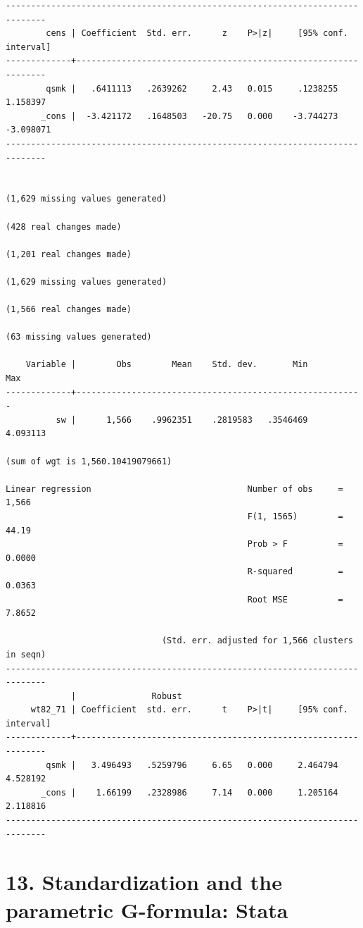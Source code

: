 \documentclass[
  10pt,
]{book}
\begin{document}
\begin{verbatim}
------------------------------------------------------------------------------
        cens | Coefficient  Std. err.      z    P>|z|     [95% conf. interval]
-------------+----------------------------------------------------------------
        qsmk |   .6411113   .2639262     2.43   0.015     .1238255    1.158397
       _cons |  -3.421172   .1648503   -20.75   0.000    -3.744273   -3.098071
------------------------------------------------------------------------------


(1,629 missing values generated)

(428 real changes made)

(1,201 real changes made)

(1,629 missing values generated)

(1,566 real changes made)

(63 missing values generated)

    Variable |        Obs        Mean    Std. dev.       Min        Max
-------------+---------------------------------------------------------
          sw |      1,566    .9962351    .2819583   .3546469   4.093113

(sum of wgt is 1,560.10419079661)

Linear regression                               Number of obs     =      1,566
                                                F(1, 1565)        =      44.19
                                                Prob > F          =     0.0000
                                                R-squared         =     0.0363
                                                Root MSE          =     7.8652

                               (Std. err. adjusted for 1,566 clusters in seqn)
------------------------------------------------------------------------------
             |               Robust
     wt82_71 | Coefficient  std. err.      t    P>|t|     [95% conf. interval]
-------------+----------------------------------------------------------------
        qsmk |   3.496493   .5259796     6.65   0.000     2.464794    4.528192
       _cons |    1.66199   .2328986     7.14   0.000     1.205164    2.118816
------------------------------------------------------------------------------
\end{verbatim}

\hypertarget{standardization-and-the-parametric-g-formula-stata}{%
\chapter*{13. Standardization and the parametric G-formula: Stata}\label{standardization-and-the-parametric-g-formula-stata}}
\end{document}
